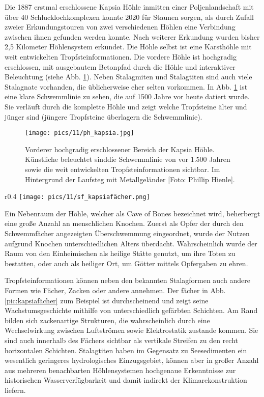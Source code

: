 \documentclass[preprint]{geomorphica} %
\begin{document}
Die 1887 erstmal erschlossene Kapsia Höhle inmitten einer Poljenlandschaft mit über 40 Schlucklochkomplexen konnte 2020 für Staunen sorgen, als durch Zufall zweier Erkundungstouren von zwei verschiedenen Höhlen eine Verbindung zwischen ihnen gefunden werden konnte. Nach weiterer Erkundung wurden bisher 2,5 Kilometer Höhlensystem erkundet. Die Höhle selbst ist eine Karsthöhle mit weit entwickelten Tropfsteinformationen. Die vordere Höhle ist hochgradig erschlossen, mit ausgebautem Betonpfad durch die Höhle und interaktiver Beleuchtung (siehe Abb. \ref{pic:kapsia}). Neben Stalagmiten und Stalagtiten sind auch viele Stalagnate vorhanden, die üblicherweise eher selten vorkommen. In Abb. \ref{pic:kapsia} ist eine klare Schwemmlinie zu sehen, die auf 1500 Jahre vor heute datiert wurde. Sie verläuft durch die komplette Höhle und zeigt welche Tropfsteine älter und jünger sind (jüngere Tropfsteine überlagern die Schwemmlinie). 

\begin{figure}[h]
    \centering
    \texttt{[image: pics/11/ph\_kapsia.jpg]}
    \caption{Vorderer hochgradig erschlossener Bereich der Kapsia Höhle. Künstliche beleuchtet sinddie Schwemmlinie von vor 1.500 Jahren sowie die weit entwickelten Tropfsteinformationen sichtbar. Im Hintergrund der Laufsteg mit Metallgeländer [Foto: Phillip Hienle].}
    \label{pic:kapsia}
\end{figure}

\begin{wrapfigure}{r}{0.4\textwidth}
    \vspace{-5mm}
    \centering
    \texttt{[image: pics/11/sf\_kapsiafächer.png]}
    \caption{Fächerartige Tropfsteinformation mit Zackenkante in der Kapsiahöhle [Foto: Simon Federle].}
    \label{pic:kapsiafächer}
\end{wrapfigure}

Ein Nebenraum der Höhle, welcher als Cave of Bones bezeichnet wird, beherbergt eine große Anzahl an menschlichen Knochen. Zuerst als Opfer der durch den Schwemmfächer angezeigten Überschwemmung eingeordnet, wurde der Nutzen aufgrund Knochen unterschiedlichen Alters überdacht. Wahrscheinlich wurde der Raum von den Einheimischen als heilige Stätte genutzt, um ihre Toten zu bestatten, oder auch als heiliger Ort, um Götter mittels Opfergaben zu ehren.

Tropfsteinformationen können neben den bekannten Stalagformen auch andere Formen wie Fächer, Zacken oder andere annehmen. Der fächer in Abb. \ref{pic:kapsiafächer} zum Beispiel ist durchscheinend und zeigt seine Wachstumsgeschichte mithilfe von unterschiedlich gefärbten Schichten. Am Rand bilden sich zackenartige Strukturen, die wahrscheinlich durch eine Wechselwirkung zwischen Luftströmen sowie Elektrostatik zustande kommen. Sie sind auch innerhalb des Fächers sichtbar als vertikale Streifen zu den recht horizontalen Schichten. Stalagtiten haben im Gegensatz zu Seesedimenten ein wesentlich geringeres hydrologisches Einzugsgebiet, können aber in großer Anzahl aus mehreren benachbarten Höhlensystemen hochgenaue Erkenntnisse zur historischen Wasserverfügbarkeit und damit indirekt der Klimarekonstruktion liefern.
\end{document}
